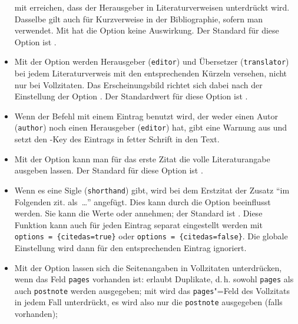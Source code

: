 \documentclass[ngerman]{scrartcl}
\begin{document}
\begin{itemize}
				mit  erreichen, dass der Herausgeber in 
				Literaturverweisen unterdrückt wird. Dasselbe gilt auch für Kurzverweise
				in der Bibliographie, sofern man  verwendet.
				Mit  hat die Option  keine
				Auswirkung. Der Standard für diese Option ist .
	\item Mit
	      der Option  werden Herausgeber
	      (\texttt{edi\-tor}) und Übersetzer (\texttt{translator}) bei jedem
	      Literaturverweis mit den entsprechenden Kürzeln versehen, nicht nur
	      bei Vollzitaten. Das Erscheinungsbild richtet sich dabei nach der
	      Einstellung der Option . Der Standardwert für
	      diese Option ist .
	\item Wenn der Befehl  mit einem Eintrag benutzt wird, der
	      weder einen Autor (\texttt{author}) noch einen Herausgeber (\texttt{editor})
	      hat, gibt \bl{} eine Warnung aus und setzt den \BibTeX{}-Key des
	      Eintrags in fetter Schrift in den Text.
	\item Mit
	      der Option  kann man für das erste Zitat die
	      volle Literaturangabe ausgeben lassen. Der Standard für diese Option ist
	      .
	\item Wenn
	      es eine Sigle (\texttt{shorthand}) gibt, wird bei 
	      dem Erstzitat der Zusatz \enquote{im Folgenden zit. als~\ldots} angefügt.
	      Dies kann durch die Option  beeinflusst werden.
	      Sie kann die Werte  oder  annehmen; 
	      der Standard ist . 
	      Diese Funktion kann auch für jeden Eintrag separat eingestellt werden mit
	      \texttt{options\,=\,\{citedas=true\}} oder 
	      \texttt{options\,=\,\{citedas=false\}}. Die globale Einstellung
	      wird dann für den entsprechenden Eintrag ignoriert.
  \item Mit
	      der Option  lassen sich die Seitenangaben in Vollzitaten 
				unterdrücken, wenn das Feld \texttt{pages} vorhanden ist:
				 erlaubt Duplikate, d.\,h. sowohl \texttt{pages}
				als auch \texttt{postnote} werden ausgegeben;
				mit  wird das \texttt{pages}"=Feld des Vollzitats
				in jedem Fall unterdrückt, es wird also nur die \texttt{postnote} ausgegeben (falls vorhanden);

\end{itemize}
\end{document}
